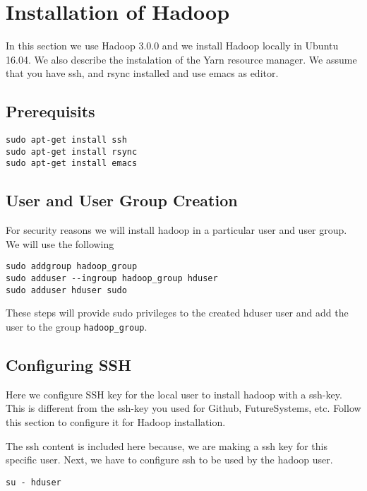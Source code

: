\section{Installation of Hadoop}\label{s:hadoop-local-installation}

In this section we use Hadoop 3.0.0 and we install Hadoop locally in
Ubuntu 16.04. We also describe the instalation of the Yarn
resource manager. We assume that you have ssh, and rsync installed and
use emacs as editor. 

\subsection{Prerequisits}

\begin{lstlisting}
sudo apt-get install ssh
sudo apt-get install rsync
sudo apt-get install emacs
\end{lstlisting}

\subsection{User and User Group Creation}

For security reasons we will install hadoop in a particular user and
user group. We will use the following

\begin{lstlisting}
sudo addgroup hadoop_group
sudo adduser --ingroup hadoop_group hduser
sudo adduser hduser sudo
\end{lstlisting}

These steps will provide sudo privileges to the created hduser
user and add the user to the group \verb|hadoop_group|.

\subsection{Configuring SSH}

\begin{NOTE}
  Here we configure SSH key for the local user to install hadoop with a ssh-key.
  This is different from the ssh-key you used for Github, FutureSystems, etc.
  Follow this section to configure it for Hadoop installation. 
\end{NOTE}

The ssh content is included here because, we are making a
ssh key for this specific user. 
Next, we have to configure ssh to be used by the hadoop user.

\begin{lstlisting}
su - hduser
\end{lstlisting}

